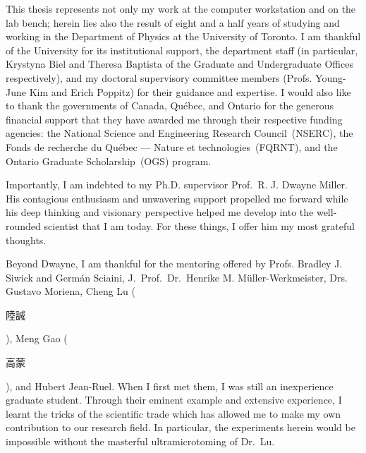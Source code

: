 \documentclass[12pt]{ut-thesis}
\begin{document}
\begin{preliminary}
\begin{abstract}

    \end{abstract}

    \cleardoublepage{}

    \begin{acknowledgements}

      This thesis represents not only my work at the computer workstation and on the lab bench;
      herein lies also the result of eight and a half years of studying and working in the Department of Physics
      at the University of Toronto. I am thankful of the University for its institutional support,
      the department staff (in particular, Krystyna Biel and Theresa Baptista of the Graduate
      and Undergraduate Offices respectively), and my doctoral supervisory committee members
      (Profs. Young-June Kim and Erich Poppitz) for their guidance and expertise.
      I would also like to thank the governments of Canada, Qu\'{e}bec, and Ontario
      for the generous financial support that they have awarded me
      through their respective funding agencies:
      the National Science and Engineering Research Council~(NSERC),
      the Fonds de recherche du Québec --- Nature et technologies~(FQRNT),
      and the Ontario Graduate Scholarship~(OGS) program.

      Importantly, I am indebted to my Ph.D. supervisor Prof.~R. J. Dwayne Miller.
      His contagious enthusiasm and unwavering support propelled me forward
      while his deep thinking and visionary perspective helped me develop
      into the well-rounded scientist that I am today.
      For these things, I offer him my most grateful thoughts.

      Beyond Dwayne, I am thankful for the mentoring offered by Profs. Bradley J. Siwick
      and Germ\'{a}n Sciaini, J.~Prof.~Dr.~Henrike M. M\"{u}ller-Werkmeister,
      Drs. Gustavo Moriena, Cheng Lu (\begin{CJK*}{UTF8}{bkai}陸誠\end{CJK*}),
      Meng Gao (\begin{CJK*}{UTF8}{bkai}高蒙\end{CJK*}), and Hubert Jean-Ruel.
      When I first met them, I was still an inexperience graduate student.
      Through their eminent example and extensive experience,
      I learnt the tricks of the scientific trade which has allowed me
      to make my own contribution to our research field.
      In particular, the experiments herein would be impossible
      without the masterful ultramicrotoming of Dr.~Lu.


\end{acknowledgements}
\end{preliminary}
\end{document}
